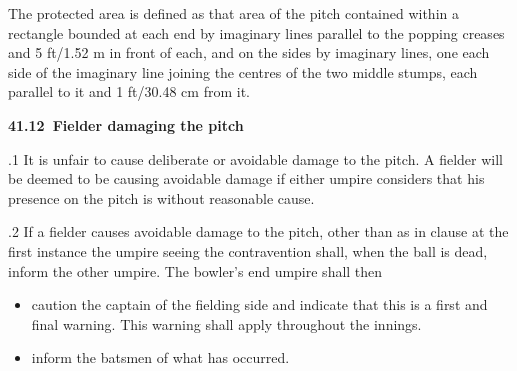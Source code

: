 \documentclass[12pt]{article}
\begin{document}
\vspace{\baselineskip}
\begin{adjustwidth}{0.0in}{0.08in}
{\fontsize{9pt}{10.8pt}\selectfont The protected area is defined as that area of the pitch contained within a rectangle bounded at each end by imaginary lines parallel to the popping creases and 5 ft/1.52 m in front of each, and on the sides by imaginary lines, one each side of the imaginary line joining the centres of the two middle stumps, each parallel to it and 1 ft/30.48 cm from it.\par}\par

\end{adjustwidth}


\vspace{\baselineskip}
{\fontsize{11pt}{13.2pt}\selectfont \textbf{41.12\  Fielder damaging the pitch}\par}\par


\vspace{\baselineskip}
\begin{adjustwidth}{0.5in}{0.26in}
{\fontsize{9pt}{10.8pt}.1 It is unfair to cause deliberate or avoidable damage to the pitch. A fielder will be deemed to be causing avoidable damage if either umpire considers that his presence on the pitch is without reasonable cause.\par}\par

\end{adjustwidth}


\vspace{\baselineskip}
\begin{adjustwidth}{0.5in}{0.21in}
{\fontsize{9pt}{10.8pt}.2 If a fielder causes avoidable damage to the pitch, other than as in clause at the first instance the umpire seeing the contravention shall, when the ball is dead, inform the other umpire. The bowler’s end umpire shall then\par}\par

\end{adjustwidth}


\vspace{\baselineskip}
\begin{itemize}
	\item {\fontsize{9pt}{10.8pt}\selectfont caution the captain of the fielding side and indicate that this is a first and final warning. This warning shall apply throughout the innings.\par}\par


\vspace{\baselineskip}
	\item {\fontsize{9pt}{10.8pt}\selectfont inform the batsmen of what has occurred.\par}
\end{itemize}\par
\end{document}

